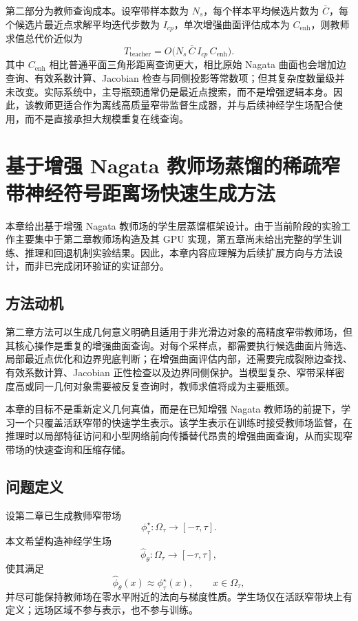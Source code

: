 \documentclass[12pt,oneside]{ctexbook}
\begin{document}
第二部分为教师查询成本。设窄带样本数为 $N_s$，每个样本平均候选片数为 $\bar C$，每个候选片最近点求解平均迭代步数为 $I_{cp}$，单次增强曲面评估成本为 $C_{\mathrm{enh}}$，则教师求值总代价近似为
\[
T_{\mathrm{teacher}}=O\big(N_s\,\bar C\,I_{cp}\,C_{\mathrm{enh}}\big).
\]
其中 $C_{\mathrm{enh}}$ 相比普通平面三角形距离查询更大，相比原始 Nagata 曲面也会增加边查询、有效系数计算、Jacobian 检查与同侧投影等常数项；但其复杂度数量级并未改变。实际系统中，主导瓶颈通常仍是最近点搜索，而不是增强逻辑本身。因此，该教师更适合作为离线高质量窄带监督生成器，并与后续神经学生场配合使用，而不是直接承担大规模重复在线查询。

\chapter{基于增强 Nagata 教师场蒸馏的稀疏窄带神经符号距离场快速生成方法}

本章给出基于增强 Nagata 教师场的学生层蒸馏框架设计。由于当前阶段的实验工作主要集中于第二章教师场构造及其 GPU 实现，第五章尚未给出完整的学生训练、推理和回退机制实验结果。因此，本章内容应理解为后续扩展方向与方法设计，而非已完成闭环验证的实证部分。

\section{方法动机}
第二章方法可以生成几何意义明确且适用于非光滑边对象的高精度窄带教师场，但其核心操作是重复的增强曲面查询。对每个采样点，都需要执行候选曲面片筛选、局部最近点优化和边界兜底判断；在增强曲面评估内部，还需要完成裂隙边查找、有效系数计算、Jacobian 正性检查以及边界同侧保护。当模型复杂、窄带采样密度高或同一几何对象需要被反复查询时，教师求值将成为主要瓶颈。

本章的目标不是重新定义几何真值，而是在已知增强 Nagata 教师场的前提下，学习一个只覆盖活跃窄带的快速学生表示。该学生表示在训练时接受教师场监督，在推理时以局部特征访问和小型网络前向传播替代昂贵的增强曲面查询，从而实现窄带场的快速查询和压缩存储。

\section{问题定义}
设第二章已生成教师窄带场
\[
\phi^\star_\tau:\Omega_\tau\to[-\tau,\tau].
\]
本文希望构造神经学生场
\[
\hat\phi_\theta:\Omega_\tau\to[-\tau,\tau],
\]
使其满足
\[
\hat\phi_\theta(x)\approx \phi^\star_\tau(x),\qquad x\in\Omega_\tau,
\]
并尽可能保持教师场在零水平附近的法向与梯度性质。学生场仅在活跃窄带块上有定义；远场区域不参与表示，也不参与训练。
\end{document}
